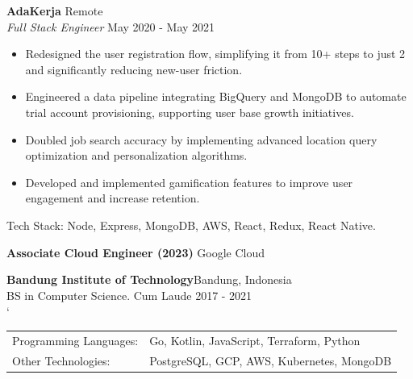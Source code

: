 \documentclass[a4paper]{article}
\begin{document}
\textbf{AdaKerja} \hfill Remote\\
\textit{Full Stack Engineer} \hfill May 2020 - May 2021\\
\vspace{-2mm}
\begin{itemize} \itemsep 1pt
    \item Redesigned the user registration flow, simplifying it from 10+ steps to just 2 and significantly reducing new-user friction.
    \item Engineered a data pipeline integrating BigQuery and MongoDB to automate trial account provisioning, supporting user base growth initiatives.
    \item Doubled job search accuracy by implementing advanced location query optimization and personalization algorithms.
    \item Developed and implemented gamification features to improve user engagement and increase retention.
\end{itemize}
Tech Stack: Node, Express, MongoDB, AWS, React, Redux, React Native.
\vspace{1.5mm}

\textbf{Associate Cloud Engineer (2023)} \hfill Google Cloud\\
\vspace{2mm}

\textbf{Bandung Institute of Technology}\hfill Bandung, Indonesia\\
BS in Computer Science. Cum Laude \hfill 2017 - 2021\\
\vspace{2mm}
`
\begin{tabular}{ l l }
	Programming Languages: & Go, Kotlin, JavaScript, Terraform, Python  \\
	Other Technologies:    & PostgreSQL, GCP, AWS, Kubernetes, MongoDB \\
\end{tabular}
\vspace{2mm}
\end{document}

